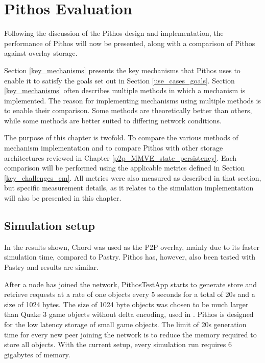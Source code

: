 \chapter{Pithos Evaluation}
\label{chp:EVALUATION}

Following the discussion of the Pithos design and implementation, the performance of Pithos will now be presented, along with a comparison of Pithos against overlay storage.

Section \ref{key_mechanisms} presents the key mechanisms that Pithos uses to enable it to satisfy the goals set out in Section \ref{use_cases_goals}. Section \ref{key_mechanisms} often describes multiple methods in which a mechanism is implemented. The reason for implementing mechanisms using multiple methods is to enable their comparison. Some methods are theoretically better than others, while some methods are better suited to differing network conditions.

The purpose of this chapter is twofold. To compare the various methods of mechanism implementation and to compare Pithos with other storage architectures reviewed in Chapter \ref{p2p_MMVE_state_persistency}. Each comparison will be performed using the applicable metrics defined in Section \ref{key_challenges_cm}. All metrics were also measured as described in that section, but specific measurement details, as it relates to the simulation implementation will also be presented in this chapter.

\section{Simulation setup}
\label{simulation_setup}

In the results shown, Chord was used as the P2P overlay, mainly due to its faster simulation time, compared to Pastry. Pithos has, however, also been tested with Pastry and results are similar.

After a node has joined the network, PithosTestApp starts to generate store and retrieve requests at a rate of one objects every 5 seconds for a total of 20s and a size of 1024 bytes. The size of 1024 byte objects was chosen to be much larger than Quake 3 game objects without delta encoding, used in \cite{Bharambe_Donnybrook}. Pithos is designed for the low latency storage of small game objects. The limit of 20s generation time for every new peer joining the network is to reduce the memory required to store all objects. With the current setup, every simulation run requires 6 gigabytes of memory.

